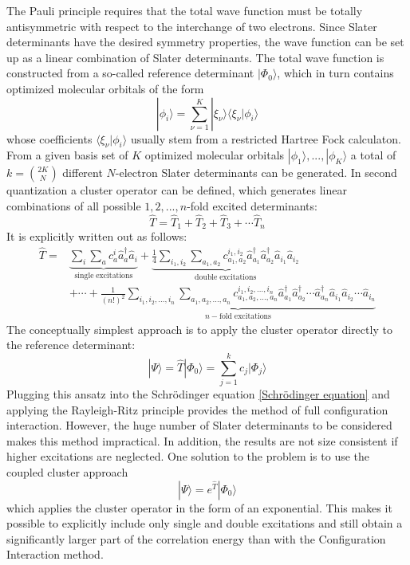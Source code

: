 \documentclass[9pt]{report}
\begin{document}
The Pauli principle requires that the total wave function must be totally antisymmetric with respect to the interchange of two electrons. Since Slater determinants have the desired symmetry properties, the wave function can be set up as a linear combination of Slater determinants. The total wave function is constructed from a so-called reference determinant $|\Phi_0\rangle$, which in turn contains optimized molecular orbitals of the form
\begin{equation}
|\phi_i\rangle=\sum_{\nu=1}^{K}|\xi_{\nu}\rangle\langle\xi_{\nu}|\phi_i\rangle
\end{equation}
whose coefficients $\langle\xi_{\nu}|\phi_i\rangle$ usually stem from a restricted Hartree Fock calculaton. From a given basis set of $K$ optimized molecular orbitals $|\phi_1\rangle,...,|\phi_K\rangle$ a total of $k=\displaystyle\binom{2K}{N}$ different $N$-electron Slater determinants can be generated. In second quantization a cluster operator can be defined, which generates linear combinations of all possible $1,2,...,n$-fold excited determinants:
\begin{equation}
\hat{T}=\hat{T}_1+\hat{T}_2+\hat{T}_3+\cdots\hat{T}_n
\end{equation}
It is explicitly written out as follows:
\begin{align}
\hat{T} =& \underbrace{\sum_{i}\sum_{a}c_{a}^{i}\hat{a}_{a}^{\dagger}\hat{a}_{i}}_{\mathrm{single}\;\mathrm{excitations}}+\underbrace{\frac{1}{4}\sum_{i_1,i_2}\sum_{a_1,a_2}c_{a_1,a_2}^{i_1,i_2}\hat{a}_{a_1}^{\dagger}\hat{a}_{a_2}^{\dagger}\hat{a}_{i_1}\hat{a}_{i_2}}_{\mathrm{double}\;\mathrm{excitations}}\\
&+\cdots + \underbrace{\frac{1}{(n!)^2}\sum_{i_1,i_2,...,i_n}\sum_{a_1,a_2,...,a_n}c_{a_1,a_2,...,a_n}^{i_1,i_2,...,i_n}\hat{a}_{a_1}^{\dagger}\hat{a}_{a_2}^{\dagger}\cdots\hat{a}_{a_n}^{\dagger}\hat{a}_{i_1}\hat{a}_{i_2}\cdots\hat{a}_{i_n}}_{n-\mathrm{fold}\;\mathrm{excitations}}
\end{align}
The conceptually simplest approach is to apply the cluster operator directly to the reference determinant:
\begin{equation}
|\Psi\rangle = \hat{T}|\Phi_0\rangle = \sum_{j=1}^{k}c_j|\Phi_j\rangle
\end{equation}
Plugging this ansatz into the Schrödinger equation \eqref{Schrödinger equation} and applying the Rayleigh-Ritz principle provides the method of full configuration interaction. However, the huge number of Slater determinants to be considered makes this method impractical. In addition, the results are not size consistent if higher excitations are neglected. One solution to the problem is to use the coupled cluster approach
\begin{equation}
|\Psi\rangle = e^{\hat{T}}|\Phi_0\rangle
\end{equation}
which applies the cluster operator in the form of an exponential. This makes it possible to explicitly include only single and double excitations and still obtain a significantly larger part of the correlation energy than with the Configuration Interaction method.
\end{document}
